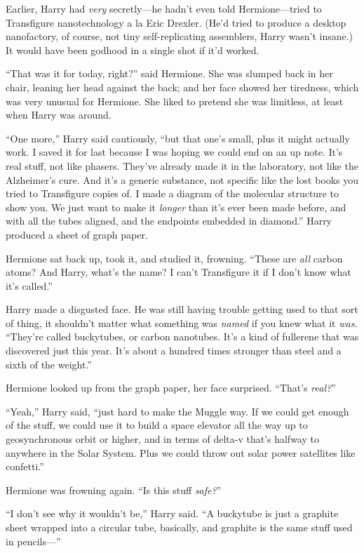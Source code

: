 Earlier, Harry had \emph{very} secretly—he hadn’t even told Hermione—tried to Transfigure nanotechnology a la Eric Drexler. (He’d tried to produce a desktop nanofactory, of course, not tiny self-replicating assemblers, Harry wasn’t insane.) It would have been godhood in a single shot if it’d worked.

“That was it for today, right?” said Hermione. She was slumped back in her chair, leaning her head against the back; and her face showed her tiredness, which was very unusual for Hermione. She liked to pretend she was limitless, at least when Harry was around.

“One more,” Harry said cautiously, “but that one’s small, plus it might actually work. I saved it for last because I was hoping we could end on an up note. It’s real stuff, not like phasers. They’ve already made it in the laboratory, not like the Alzheimer’s cure. And it’s a generic substance, not specific like the lost books you tried to Transfigure copies of. I made a diagram of the molecular structure to show you. We just want to make it \emph{longer} than it’s ever been made before, and with all the tubes aligned, and the endpoints embedded in diamond.” Harry produced a sheet of graph paper.

Hermione sat back up, took it, and studied it, frowning. “These are \emph{all} carbon atoms? And Harry, what’s the name? I can’t Transfigure it if I don’t know what it’s called.”

Harry made a disgusted face. He was still having trouble getting used to that sort of thing, it shouldn’t matter what something was \emph{named} if you knew what it \emph{was.} “They’re called buckytubes, or carbon nanotubes. It’s a kind of fullerene that was discovered just this year. It’s about a hundred times stronger than steel and a sixth of the weight.”

Hermione looked up from the graph paper, her face surprised. “That’s \emph{real?}”

“Yeah,” Harry said, “just hard to make the Muggle way. If we could get enough of the stuff, we could use it to build a space elevator all the way up to geosynchronous orbit or higher, and in terms of delta-v that’s halfway to anywhere in the Solar System. Plus we could throw out solar power satellites like confetti.”

Hermione was frowning again. “Is this stuff \emph{safe?}”

“I don’t see why it wouldn’t be,” Harry said. “A buckytube is just a graphite sheet wrapped into a circular tube, basically, and graphite is the same stuff used in pencils—”

